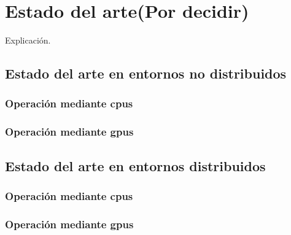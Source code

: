 
\chapter{Estado del arte(Por decidir)\label{chapEstadoDelArte}}

Explicación.


\section{Estado del arte en entornos no distribuidos}
\subsection{Operación mediante cpus}
\subsection{Operación mediante gpus}
\section{Estado del arte en entornos distribuidos}
\subsection{Operación mediante cpus}
\subsection{Operación mediante gpus}


\newpage
